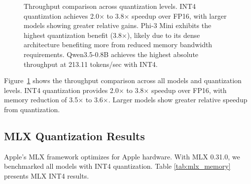 \documentclass[conference]{IEEEtran}
\begin{document}
\begin{figure}[t]
\centering
{}
\caption{Throughput comparison across quantization levels. INT4 quantization achieves 2.0$\times$ to 3.8$\times$ speedup over FP16, with larger models showing greater relative gains. Phi-3 Mini exhibits the highest quantization benefit (3.8$\times$), likely due to its dense architecture benefiting more from reduced memory bandwidth requirements. Qwen3.5-0.8B achieves the highest absolute throughput at 213.11 tokens/sec with INT4.}
\label{fig:tokens_per_sec}
\end{figure}

Figure~\ref{fig:tokens_per_sec} shows the throughput comparison across all models and quantization levels. INT4 quantization provides 2.0$\times$ to 3.8$\times$ speedup over FP16, with memory reduction of 3.5$\times$ to 3.6$\times$. Larger models show greater relative speedup from quantization.

\subsection{MLX Quantization Results}

Apple's MLX framework optimizes for Apple hardware. With MLX 0.31.0, we benchmarked all models with INT4 quantization. Table \ref{tab:mlx_memory} presents MLX INT4 results.
\end{document}
